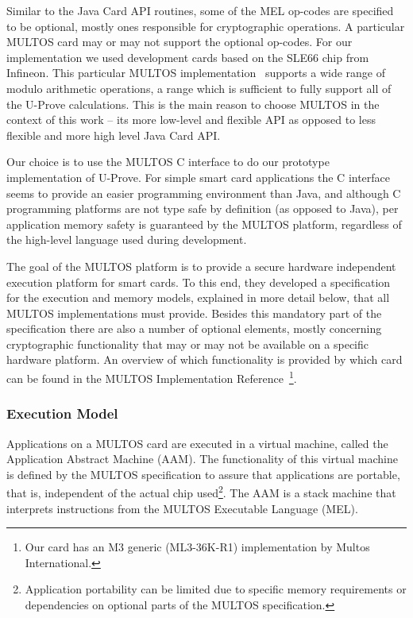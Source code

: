 Similar to the Java Card API routines, some of the MEL op-codes are
specified to be optional, mostly ones responsible for cryptographic
operations. A particular MULTOS card may or
may not support the optional op-codes. For our implementation we used
development cards based on the SLE66 chip from Infineon. This particular
MULTOS implementation~\cite{MULTOS_Implementation2010} supports a wide
range of modulo arithmetic operations, a range which is sufficient
to fully support all of the U-Prove calculations.
This is the main reason to choose MULTOS in the context of this work --
its more low-level and flexible API as opposed to less flexible
and more high level Java Card API.


Our choice is to use the MULTOS C interface to do our prototype
implementation of U-Prove. For simple smart card applications the C
interface seems to provide an easier programming environment than
Java, and although C programming platforms are not type safe by
definition (as opposed to Java), per application memory safety is
guaranteed by the MULTOS platform, regardless of the high-level language
used during development.

The goal of the MULTOS platform is to provide a secure hardware independent
execution platform for smart cards. To this end, they developed a specification
for the execution and memory models, explained in more detail below, that all
MULTOS implementations must provide. Besides this mandatory part of the
specification there are also a number of optional elements, mostly concerning
cryptographic functionality that may or may not be available on a specific
hardware platform. An overview of which functionality is provided by which card
can be found in the MULTOS Implementation Reference~\cite{MIR2012}\footnote{Our
card has an M3 generic (ML3-36K-R1) implementation by Multos International.}.

\subsubsection{Execution Model}

Applications on a MULTOS card are executed in a virtual machine, called the
Application Abstract Machine (AAM). The functionality of this virtual machine
is defined by the MULTOS specification to assure that applications are
portable, that is, independent of the actual chip used\footnote{Application
portability can be limited due to specific memory requirements or dependencies
on optional parts of the MULTOS specification.}. The AAM is a stack machine
that interprets instructions from the MULTOS Executable Language (MEL).

